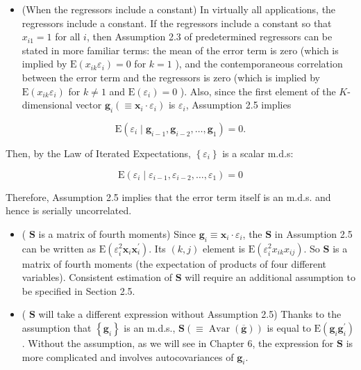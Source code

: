 \documentclass[10pt]{article}
\begin{document}
\begin{itemize}
  \item (When the regressors include a constant) In virtually all applications, the regressors include a constant. If the regressors include a constant so that $x_{i 1}=1$ for all $i$, then Assumption 2.3 of predetermined regressors can be stated in more familiar terms: the mean of the error term is zero (which is implied by $\mathrm{E}\left(x_{i k} \varepsilon_{i}\right)=0$ for $k=1$ ), and the contemporaneous correlation between the error term and the regressors is zero (which is implied by $\mathrm{E}\left(x_{i k} \varepsilon_{i}\right)$ for $k \neq 1$ and $\mathrm{E}\left(\varepsilon_{i}\right)=0$ ). Also, since the first element of the $K$-dimensional vector $\mathbf{g}_{i}\left(\equiv \mathbf{x}_{i} \cdot \varepsilon_{i}\right)$ is $\varepsilon_{i}$, Assumption 2.5 implies
\end{itemize}

$$
\mathrm{E}\left(\varepsilon_{i} \mid \mathbf{g}_{i-1}, \mathbf{g}_{i-2}, \ldots, \mathbf{g}_{1}\right)=0 .
$$

Then, by the Law of Iterated Expectations, $\left\{\varepsilon_{i}\right\}$ is a scalar m.d.s:


\begin{equation*}
\mathrm{E}\left(\varepsilon_{i} \mid \varepsilon_{i-1}, \varepsilon_{i-2}, \ldots, \varepsilon_{1}\right)=0 \tag{2.3.3}
\end{equation*}


Therefore, Assumption 2.5 implies that the error term itself is an m.d.s. and hence is serially uncorrelated.

\begin{itemize}
  \item ( $\mathbf{S}$ is a matrix of fourth moments) Since $\mathbf{g}_{i} \equiv \mathbf{x}_{i} \cdot \varepsilon_{i}$, the $\mathbf{S}$ in Assumption 2.5 can be written as $\mathrm{E}\left(\varepsilon_{i}^{2} \mathbf{x}_{i} \mathbf{x}_{i}^{\prime}\right)$. Its $(k, j)$ element is $\mathrm{E}\left(\varepsilon_{i}^{2} x_{i k} x_{i j}\right)$. So $\mathbf{S}$ is a matrix of fourth moments (the expectation of products of four different variables). Consistent estimation of $\mathbf{S}$ will require an additional assumption to be specified in Section 2.5.
  \item ( $\mathbf{S}$ will take a different expression without Assumption 2.5) Thanks to the assumption that $\left\{\mathbf{g}_{i}\right\}$ is an m.d.s., $\mathbf{S}(\equiv \operatorname{Avar}(\overline{\mathbf{g}}))$ is equal to $\mathrm{E}\left(\mathbf{g}_{i} \mathbf{g}_{i}^{\prime}\right)$. Without the assumption, as we will see in Chapter 6, the expression for $\mathbf{S}$ is more complicated and involves autocovariances of $\mathbf{g}_{i}$.
\end{itemize}
\end{document}
